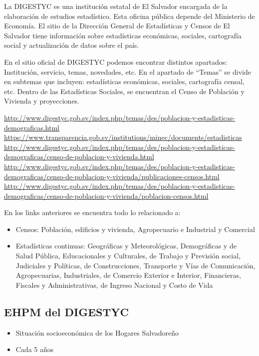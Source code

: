\documentclass[
]{book}
\providecommand{\tightlist}{%
  \setlength{\itemsep}{0pt}\setlength{\parskip}{0pt}}
\begin{document}
La DIGESTYC es una institución estatal de El Salvador encargada de la elaboración de estudios estadístico. Esta oficina pública depende del Ministerio de Economía. El sitio de la Dirección General de Estadísticas y Censos de El Salvador tiene información sobre estadísticas económicas, sociales, cartografía social y actualización de datos sobre el país.

En el sitio oficial de DIGESTYC podemos encontrar distintos apartados: Institución, servicio, temas, novedades, etc. En el apartado de ``Temas'' se divide en subtemas que incluyen: estadísticas económicas, sociales, cartografía censal, etc. Dentro de las Estadísticas Sociales, se encuentran el Censo de Población y Vivienda y proyecciones.

\url{http://www.digestyc.gob.sv/index.php/temas/des/poblacion-y-estadisticas-demograficas.html}
\url{https://www.transparencia.gob.sv/institutions/minec/documents/estadisticas}
\url{http://www.digestyc.gob.sv/index.php/temas/des/poblacion-y-estadisticas-demograficas/censo-de-poblacion-y-vivienda.html}
\url{http://www.digestyc.gob.sv/index.php/temas/des/poblacion-y-estadisticas-demograficas/censo-de-poblacion-y-vivienda/publicaciones-censos.html}
\url{http://www.digestyc.gob.sv/index.php/temas/des/poblacion-y-estadisticas-demograficas/censo-de-poblacion-y-vivienda/poblacion-censos.html}

En los links anteriores se encuentra todo lo relacionado a:

\begin{itemize}
\item
  Censos: Población, edificios y vivienda, Agropecuario e Industrial y Comercial
\item
  Estadísticas continuas: Geográficas y Meteorológicas, Demográficas y de Salud Pública, Educacionales y Culturales, de Trabajo y Previsión social, Judiciales y Políticas, de Construcciones, Transporte y Vías de Comunicación, Agropecuarias, Industriales, de Comercio Exterior e Interior, Financieras, Fiscales y Administrativas, de Ingreso Nacional y Costo de Vida
\end{itemize}

\hypertarget{ehpm-del-digestyc}{%
\subsection{EHPM del DIGESTYC}\label{ehpm-del-digestyc}}

\begin{itemize}
\tightlist
\item
  Situación socioeconómica de los Hogares Salvadoreño
\item
  Cada 5 años
\end{itemize}
\end{document}
